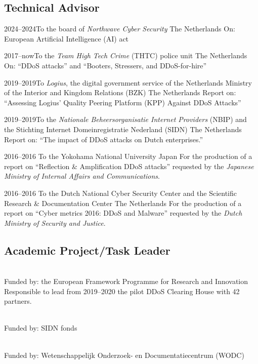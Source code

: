 \documentclass[print]{styles/friggeri-cv-mac} %
\begin{document}
\subsection{Technical Advisor}\vspace{-5pt}
\begin{entrylist}
	
	\entry
	{2024--2024}{To the board of \textit{Northwave Cyber Security}}
	{The Netherlands}
	{On: European Artificial Intelligence (AI) act}
	
	\entry
	{2017--now}{To the \textit{Team High Tech Crime} (THTC) police unit}
	{The Netherlands}
	{On: ``DDoS attacks'' and ``Booters, Stressers, and DDoS-for-hire''}
	
	\entry
	{2019--2019}{To \textit{Logius}, the digital government service of the Netherlands Ministry of the Interior and Kingdom Relations (BZK)}
	{The Netherlands}
	{Report on: ``Assessing Logius' Quality Peering Platform (KPP) Against DDoS Attacks''}
	
	\entry
	{2019--2019}{To the \textit{Nationale Beheersorganisatie Internet Providers} (NBIP) and the Stichting Internet Domeinregistratie Nederland (SIDN)}
	{The Netherlands}
	{Report on: ``The impact of DDoS attacks on Dutch enterprises.''}
	
	\entry
	{2016--2016}
	{To the Yokohama National University}
	{Japan}
	{For the production of a report on ``Reflection \& Amplification DDoS attacks''
		requested by the \emph{Japanese Ministry of Internal Affairs and
			Communications}.}
	
	\entry
	{2016--2016}
	{To the Dutch National Cyber Security Center and the Scientific Research \& Documentation Center}
	{The Netherlands}
	{For the production of a report on ``Cyber metrics 2016: DDoS and Malware'' requested by the \emph{Dutch Ministry of Security and Justice}.} 
	
\end{entrylist}

\subsection{Academic Project/Task Leader}\vspace{-5pt}
\begin{entrylist}
	
{\\Funded by: the European Framework Programme for Research and Innovation}
{Responsible to lead from 2019--2020 the pilot DDoS Clearing House with 42 partners.}%

{\\Funded by: SIDN fonds}%
{}

{\\Funded by: Wetenschappelijk Onderzoek- en Documentatiecentrum (WODC)}%
{}
\end{entrylist}
\end{document}
